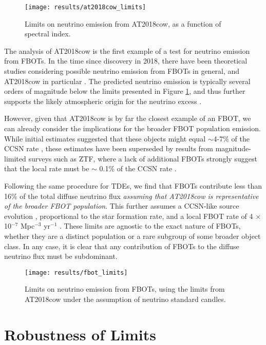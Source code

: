 \begin{figure}[!ht]
	\centering \texttt{[image: results/at2018cow\_limits]}
	\caption{Limits on neutrino emission from AT2018cow, as a function of spectral index.}
	\label{fig:at2018cow_limits}
\end{figure}

The analysis of AT2018cow is the first example of a test for neutrino emission from FBOTs. In the time since discovery in 2018, there have been theoretical studies considering possible neutrino emission from FBOTs in general, and AT2018cow in particular . The predicted neutrino emission is typically several orders of magnitude below the limits presented in Figure \ref{fig:at2018cow_limits}, and thus further supports the likely atmospheric origin for the neutrino excess \cite{2018ATel11785....1B}.

However, given that AT2018cow is by far the closest example of an FBOT, we can already consider the implications for the broader FBOT population emission. While initial estimates suggested that these objects might equal $\sim$4-7\% of the CCSN rate \cite{drout_fbot, fang_fbot_19}, these estimates have been superseded by results from magnitude-limited surveys such as ZTF, where a lack of additional FBOTs strongly suggest that the local rate must be $\sim$ 0.1\% of the CCSN rate . 

Following the same procedure for TDEs, we find that FBOTs contribute less than 16\% of the total diffuse neutrino flux \emph{assuming that AT2018cow is representative of the broader FBOT population}. This further assumes a CCSN-like source evolution , proportional to the star formation rate, and a local FBOT rate of 4 $\times$ 10$^{-7}$ Mpc$^{-3}$ yr$^{-1}$ \cite{ho_koala}. These limits are agnostic to the exact nature of FBOTs, whether they are a distinct population or a rare subgroup of some broader object class. In any case, it is clear  that any contribution of FBOTs to the diffuse neutrino flux must be subdominant.

\begin{figure}[!ht]
	\centering \texttt{[image: results/fbot\_limits]}
	\caption{Limits on neutrino emission from FBOTs, using the limits from AT2018cow under the assumption of neutrino standard candles.}
	\label{fig:fbot_limits}
\end{figure}

\section{Robustness of Limits}

